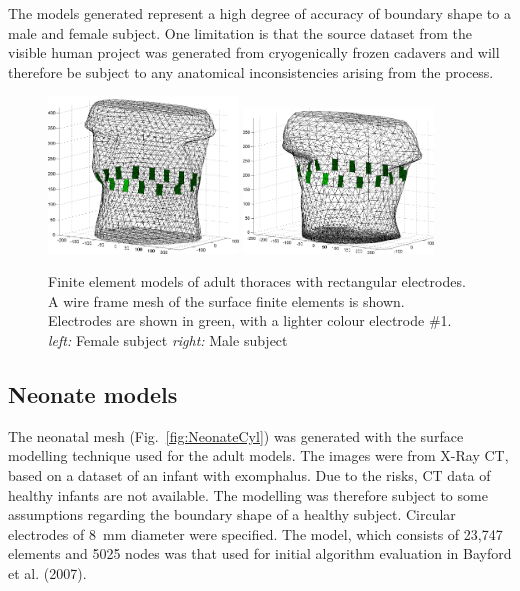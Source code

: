 \documentclass[12pt]{iopart}
\begin{document}
The models generated represent a high degree of accuracy of boundary
shape to a male and female subject.  One limitation is that the
source dataset from the visible
human project was generated from cryogenically frozen cadavers and
will therefore be subject to any anatomical inconsistencies arising from
the process.


\begin{figure}[bhtp]
\begin{center}
  \includegraphics[width= 0.45\textwidth]
         {figures/female_t_mdl.png}
  \includegraphics[width= 0.45\textwidth]
         {figures/male_t_mdl.png}
\caption{ \label{fig:AdultFEM}
Finite element models of adult thoraces with
rectangular electrodes. A wire frame mesh
of the surface finite elements is shown.
Electrodes are shown in green,
with a lighter colour electrode \#1.
{\em left:} Female subject
{\em right:} Male subject
}
\end{center}
\end{figure}


\subsection{Neonate models}

The neonatal mesh (Fig.\ \ref{fig:NeonateCyl})
 was generated with the surface modelling
technique used for the adult models. The images 
were from X-Ray CT, based on a 
dataset of an infant with exomphalus. Due to the
risks, CT data of healthy infants are not 
available. The modelling was therefore subject to
some assumptions regarding the boundary shape
of a healthy subject. 
Circular electrodes of 8~mm diameter were specified.
 The model, which
consists of 23,747 elements and 5025 nodes was that used
for initial algorithm evaluation in Bayford et al. (2007).
\end{document}
